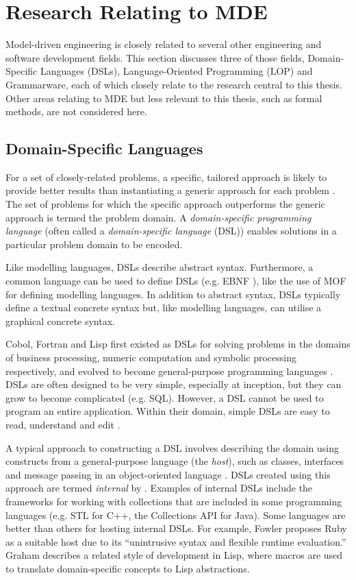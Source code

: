 
\section{Research Relating to MDE}
\label{sec:mde_related}
Model-driven engineering is closely related to several other engineering and software development fields. This section discusses three of those fields, Domain-Specific Languages (DSLs), Language-Oriented Programming (LOP) and Grammarware, each of which closely relate to the research central to this thesis. Other areas relating to MDE but less relevant to this thesis, such as formal methods, are not considered here.

\subsection{Domain-Specific Languages}
\label{subsec:dsls}
For a set of closely-related problems, a specific, tailored approach is likely to provide better results than instantiating a generic approach for each problem \cite{deursen00dslbib}. The set of problems for which the specific approach outperforms the generic approach is termed the problem domain. A \textit{domain-specific programming language} (often called a \textit{domain-specific language} (DSL)) enables solutions in a particular problem domain to be encoded.

Like modelling languages, DSLs describe abstract syntax. Furthermore, a common language can be used to define DSLs (e.g. EBNF \cite{ebnf}), like the use of MOF for defining modelling languages. In addition to abstract syntax, DSLs typically define a textual concrete syntax but, like modelling languages, can utilise a graphical concrete syntax.

Cobol, Fortran and Lisp first existed as DSLs for solving problems in the domains of business processing, numeric computation and symbolic processing respectively, and evolved to become general-purpose programming languages \cite{deursen00dslbib}. DSLs are often designed to be very simple, especially at inception, but they can grow to become complicated (e.g. SQL). However, a DSL cannot be used to program an entire application. Within their domain, simple DSLs are easy to read, understand and edit \cite{fowler05language}.

A typical approach to constructing a DSL involves describing the domain using constructs from a general-purpose language (the \textit{host}), such as classes, interfaces and message passing in an object-oriented language \cite{dmitriev04lop}. DSLs created using this approach are termed \emph{internal} by \cite{fowler10dsls}. Examples of internal DSLs include the frameworks for working with collections that are included in some programming languages (e.g. STL for C++, the Collections API for Java). Some languages are better than others for hosting internal DSLs. For example, Fowler \cite{fowler05language} proposes Ruby as a suitable host due to its ``unintrusive syntax and flexible runtime evaluation.'' Graham \cite{graham93lisp} describes a related style of development in Lisp, where macros are used to translate domain-specific concepts to Lisp abstractions.

